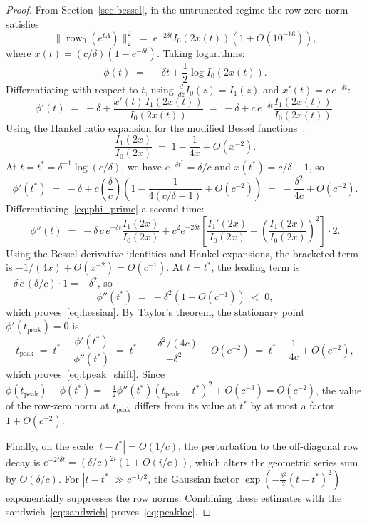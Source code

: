 \documentclass[11pt,reqno]{article}
\theoremstyle{plain}
\theoremstyle{definition}
\theoremstyle{remark}
\numberwithin{equation}{section}
\begin{document}
\begin{proof}
From Section~\ref{sec:bessel}, in the untruncated regime the row-zero norm satisfies
\[
  \|\operatorname{row}_0(e^{tA})\|_2^2 \;=\; e^{-2\delta t} I_0(2x(t)) \left(1 + O(10^{-16})\right),
\]
where $x(t) = (c/\delta)(1 - e^{-\delta t})$. Taking logarithms:
\[
  \phi(t) \;=\; -\delta t + \frac{1}{2}\log I_0(2x(t)).
\]
Differentiating with respect to $t$, using $\frac{d}{dz}I_0(z) = I_1(z)$ and $x'(t) = c\,e^{-\delta t}$:
\begin{equation}\label{eq:phi_prime}
  \phi'(t) \;=\; -\delta + \frac{x'(t)\,I_1(2x(t))}{I_0(2x(t))} \;=\; -\delta + c\,e^{-\delta t} \frac{I_1(2x(t))}{I_0(2x(t))}.
\end{equation}
Using the Hankel ratio expansion for the modified Bessel functions~\cite[10.40.1]{DLMF}:
\begin{equation}\label{eq:bessel_ratio}
  \frac{I_1(2x)}{I_0(2x)} \;=\; 1 - \frac{1}{4x} + O(x^{-2}).
\end{equation}
At $t = t^* = \delta^{-1}\log(c/\delta)$, we have $e^{-\delta t^*} = \delta/c$ and $x(t^*) = c/\delta - 1$, so
\[
  \phi'(t^*) \;=\; -\delta + c\left(\frac{\delta}{c}\right) \left(1 - \frac{1}{4(c/\delta - 1)} + O(c^{-2})\right) \;=\; -\frac{\delta^2}{4c} + O(c^{-2}).
\]
Differentiating~\eqref{eq:phi_prime} a second time:
\[
  \phi''(t) \;=\; -\delta\,c\,e^{-\delta t} \frac{I_1(2x)}{I_0(2x)} + c^2 e^{-2\delta t} \left[\frac{I_1'(2x)}{I_0(2x)} - \left(\frac{I_1(2x)}{I_0(2x)}\right)^2\right] \cdot 2.
\]
Using the Bessel derivative identities and Hankel expansions, the bracketed term is $-1/(4x) + O(x^{-2}) = O(c^{-1})$. At $t = t^*$, the leading term is $-\delta\,c\,(\delta/c) \cdot 1 = -\delta^2$, so
\[
  \phi''(t^*) \;=\; -\delta^2 \left(1 + O(c^{-1})\right) \;<\; 0,
\]
which proves~\eqref{eq:hessian}. By Taylor's theorem, the stationary point $\phi'(t_{\mathrm{peak}}) = 0$ is
\[
  t_{\mathrm{peak}} \;=\; t^* - \frac{\phi'(t^*)}{\phi''(t^*)} \;=\; t^* - \frac{-\delta^2/(4c)}{-\delta^2} + O(c^{-2}) \;=\; t^* - \frac{1}{4c} + O(c^{-2}),
\]
which proves~\eqref{eq:tpeak_shift}. Since $\phi(t_{\mathrm{peak}}) - \phi(t^*) = -\frac{1}{2}\phi''(t^*)(t_{\mathrm{peak}} - t^*)^2 + O(c^{-3}) = O(c^{-2})$, the value of the row-zero norm at $t_{\mathrm{peak}}$ differs from its value at $t^*$ by at most a factor $1 + O(c^{-2})$.

Finally, on the scale $|t - t^*| = O(1/c)$, the perturbation to the off-diagonal row decay is $e^{-2i\delta t} = (\delta/c)^{2i}(1 + O(i/c))$, which alters the geometric series sum by $O(\delta/c)$. For $|t - t^*| \gg c^{-1/2}$, the Gaussian factor $\exp(-\frac{\delta^2}{2}(t - t^*)^2)$ exponentially suppresses the row norms. Combining these estimates with the sandwich~\eqref{eq:sandwich} proves~\eqref{eq:peakloc}.
\end{proof}
\end{document}
